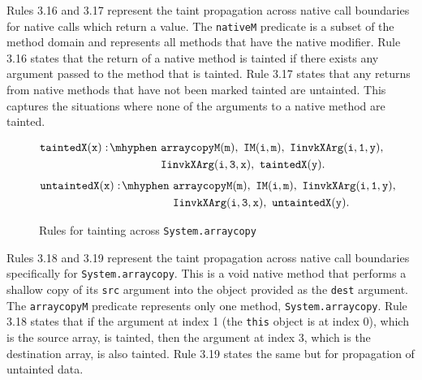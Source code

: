 Rules 3.16 and 3.17 represent the taint propagation across native call
boundaries for native calls which return a value. The \texttt{nativeM}
predicate is a subset of the method domain and represents all methods
that have the native modifier. Rule 3.16 states that the return of a
native method is tainted if there exists any argument passed to the
method that is tainted. Rule 3.17 states that any returns from native
methods that have not been marked tainted are untainted. This captures
the situations where none of the arguments to a native method are
tainted.
\begin{figure}[H]
\begin{equation}
  \begin{split}
    \mathtt{taintedX(x) \is} & \mathtt{arraycopyM(m) \also IM(i,m)
      \also IinvkXArg(i,1,y) \also} \\ & \mathtt{IinvkXArg(i,3,x)
      \also taintedX(y).} \\
  \end{split}
\end{equation}
\begin{equation}
  \begin{split}
    \mathtt{untaintedX(x) \is} & \mathtt{arraycopyM(m) \also IM(i,m)
      \also IinvkXArg(i,1,y) \also} \\ & \mathtt{IinvkXArg(i,3,x)
      \also untaintedX(y).} \\
  \end{split}
\end{equation}
\caption{Rules for tainting across \texttt{System.arraycopy}}\label{fig:arraycopy}
\end{figure}

Rules 3.18 and 3.19 represent the taint propagation across native call
boundaries specifically for \texttt{System.arraycopy}. This is a void
native method that performs a shallow copy of its \texttt{src}
argument into the object provided as the \texttt{dest} argument. The
\texttt{arraycopyM} predicate represents only one method,
\texttt{System.arraycopy}. Rule 3.18 states that if the argument at
index 1 (the \texttt{this} object is at index 0), which is the source
array, is tainted, then the argument at index 3, which is the
destination array, is also tainted. Rule 3.19 states the same but for
propagation of untainted data.

